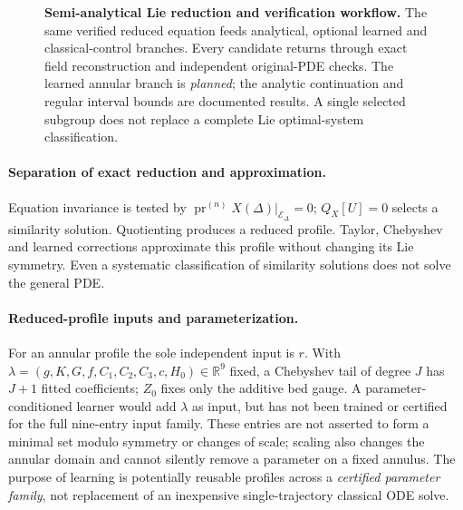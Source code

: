 \documentclass[12pt,a4paper,oneside]{report}
\numberwithin{equation}{chapter}
\theoremstyle{remark}\newtheorem{remark}[theorem]{Remark}
\newcommand{\pr}{\operatorname{pr}}
\begin{document}
\begin{figure}[!htb]
\caption[Semi-analytical reduction and verification workflow]{\textbf{Semi-analytical Lie reduction and verification workflow.}
The same verified reduced equation feeds analytical, optional learned and
classical-control branches. Every candidate returns through exact field
reconstruction and independent original-PDE checks. The learned annular
branch is \emph{planned}; the analytic continuation and regular interval
bounds are documented results. A single selected subgroup does not replace
a complete Lie optimal-system classification.}\label{fig:chain}
\end{figure}

\paragraph{Separation of exact reduction and approximation.}
Equation invariance is tested by
$\pr^{(n)}X(\Delta)|_{\mathscr E_\Delta}=0$;
$Q_X[U]=0$ selects a similarity solution. Quotienting produces a reduced
profile. Taylor, Chebyshev and learned corrections approximate this
profile without changing its Lie symmetry. Even a systematic
classification of similarity solutions does not solve the general PDE.

\paragraph{Reduced-profile inputs and parameterization.}
For an annular profile the sole independent input is $r$. With
$\lambda=(g,K,G,f,C_1,C_2,C_3,c,H_0)\in\mathbb R^9$ fixed, a
Chebyshev tail of degree $J$ has $J+1$ fitted coefficients; $Z_0$
fixes only the additive bed gauge. A parameter-conditioned learner would
add $\lambda$ as input, but has not been trained or certified for the
full nine-entry input family. These entries are not asserted to form a
minimal set modulo symmetry or changes of scale; scaling also changes the
annular domain and cannot silently remove a parameter on a fixed annulus. The purpose of learning is
potentially reusable profiles across a \emph{certified parameter family},
not replacement of an inexpensive single-trajectory classical ODE solve.
\end{document}
